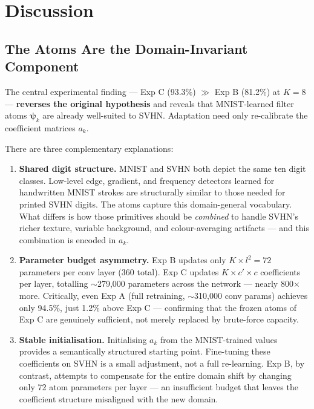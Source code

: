 \documentclass[11pt,letterpaper]{article}
\newcommand{\psivec}{\boldsymbol{\psi}}
\begin{document}
\section{Discussion}
\label{sec:discussion}

\subsection{The Atoms Are the Domain-Invariant Component}

The central experimental finding — Exp C (93.3\%) $\gg$ Exp B (81.2\%) at
$K=8$ — \textbf{reverses the original hypothesis} and reveals that
MNIST-learned filter atoms $\psivec_k$ are already well-suited to SVHN.
Adaptation need only re-calibrate the coefficient matrices $a_k$.

There are three complementary explanations:

\begin{enumerate}[leftmargin=*]
  \item \textbf{Shared digit structure.}
        MNIST and SVHN both depict the same ten digit classes.  Low-level
        edge, gradient, and frequency detectors learned for handwritten
        MNIST strokes are structurally similar to those needed for printed
        SVHN digits.  The atoms capture this domain-general vocabulary.
        What differs is how those primitives should be \emph{combined} to
        handle SVHN's richer texture, variable background, and
        colour-averaging artifacts — and this combination is encoded in $a_k$.

  \item \textbf{Parameter budget asymmetry.}
        Exp B updates only $K \times l^2 = 72$ parameters per conv layer
        (360 total).  Exp C updates $K \times c' \times c$ coefficients per
        layer, totalling $\sim$279{,}000 parameters across the network —
        nearly 800$\times$ more.  Critically, even Exp A (full retraining,
        $\sim$310{,}000 conv params) achieves only 94.5\%, just 1.2\% above
        Exp C — confirming that the frozen atoms of Exp C are genuinely
        sufficient, not merely replaced by brute-force capacity.

  \item \textbf{Stable initialisation.}
        Initialising $a_k$ from the MNIST-trained values provides a
        semantically structured starting point.  Fine-tuning these coefficients
        on SVHN is a small adjustment, not a full re-learning.  Exp B,
        by contrast, attempts to compensate for the entire domain shift by
        changing only 72 atom parameters per layer — an insufficient budget
        that leaves the coefficient structure misaligned with the new domain.
\end{enumerate}
\end{document}
